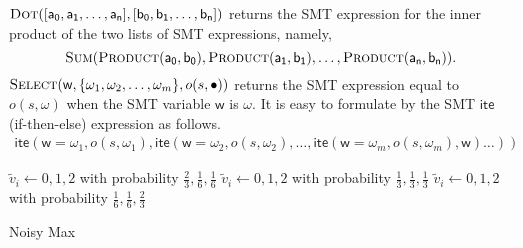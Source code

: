 $\textmd{\textsc{Dot}} ([\mathsf{a_0}, \mathsf{a_1}, \ldots,
\mathsf{a_n}], [\mathsf{b_0}, \mathsf{b_1}, \ldots, \mathsf{b_n}])$
returns the SMT expression for the inner product of the two lists of
SMT expressions, namely,
\[
  \textmd{\textsc{Sum}} (
  \textmd{\textsc{Product}}(\mathsf{a_0}, \mathsf{b_0}),
  \textmd{\textsc{Product}}(\mathsf{a_1}, \mathsf{b_1}),
  \ldots,
  \textmd{\textsc{Product}}(\mathsf{a_n}, \mathsf{b_n})
  ).
\]
$\textmd{\textsc{Select}} (\mathsf{w}, \{ \omega_1, \omega_2, \ldots,
\omega_m\}, o (s, \bullet))$ 
returns the SMT expression equal to $o (s, \omega)$ when the SMT
variable $\mathsf{w}$ is $\omega$. It is easy to formulate by
the SMT $\mathsf{ite}$ (if-then-else) expression as follows.
\begin{align*}
  \mathsf{ite} (\mathsf{w} = \omega_1, o (s, \omega_1),
  \mathsf{ite} (\mathsf{w} = \omega_2, o (s, \omega_2),
  \ldots
  ,\mathsf{ite} (\mathsf{w} = \omega_m, o (s, \omega_m), \mathsf{w})
  \ldots))
\end{align*}


\begin{algorithm}
  \begin{algorithmic}[1]
                {$\tilde{v}_i \leftarrow 0, 1, 2$ with probability
                 $\frac{2}{3}, \frac{1}{6}, \frac{1}{6}$}
                {$\tilde{v}_i \leftarrow 0, 1, 2$ with probability
                 $\frac{1}{3}, \frac{1}{3}, \frac{1}{3}$}
                {$\tilde{v}_i \leftarrow 0, 1, 2$ with probability
                 $\frac{1}{6}, \frac{1}{6}, \frac{2}{3}$}
        \EndMatch
      \EndFor
    \EndFunction
  \end{algorithmic}
  \caption{Noisy Max}
  \label{algorithm:noisy-max}
\end{algorithm}

